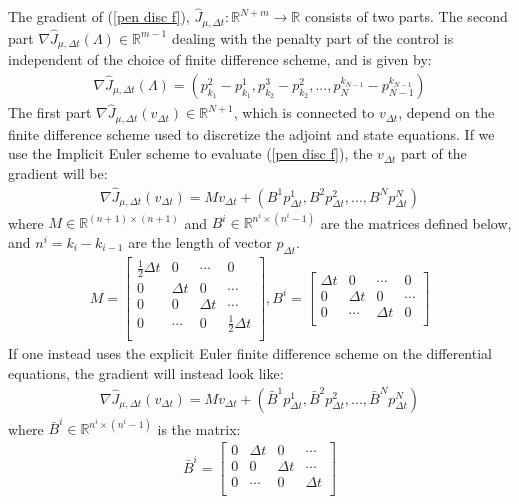 \begin{theorem}
The gradient of (\ref{pen disc f}), $\hat J_{\mu,\Delta t}:\mathbb{R}^{N+m}\rightarrow\mathbb{R}$ consists of two parts. The second part $ \nabla\hat J_{\mu,\Delta t}(\Lambda)\in\mathbb{R}^{m-1}$ dealing with the penalty part of the control is independent of the choice of finite difference scheme, and is given by:
\begin{align}
\nabla\hat J_{\mu,\Delta t}(\Lambda) = (p_{k_1}^{2}-p_{k_1}^{1},p_{k_2}^{3}-p_{k_2}^{2},...,p_{N}^{k_{N-1}}-p_{N-1}^{k_{N-1}}) \label{num_pen_grad_lam}
\end{align} 
The first part $ \nabla\hat J_{\mu,\Delta t}(v_{\Delta t})\in\mathbb{R}^{N+1}$, which is connected to $v_{\Delta t}$, depend on the finite difference scheme used to discretize the adjoint and state equations. If we use the Implicit Euler scheme to evaluate (\ref{pen disc f}), the $v_{\Delta t}$ part of the gradient will be:
\begin{align}
\nabla\hat J_{\mu,\Delta t}(v_{\Delta t})= Mv_{\Delta t} + (B^1p_{\Delta t}^1,B^2p_{\Delta t}^2,...,B^Np_{\Delta t}^N) \label{num_pen_grad_v}
\end{align}
where $M\in \mathbb{R}^{(n+1)\times (n+1)}$ and $B^i\in \mathbb{R}^{n^i\times (n^i-1)}$ are the matrices defined below, and $n^i=k_i-k_{i-1}$ are the length of vector $p_{\Delta t}$.
\begin{align*}
M=\left[ \begin{array}{cccc}
   \frac{1}{2}\Delta t & 0 & \cdots & 0 \\  
   0& \Delta t & 0 & \cdots \\ 
   0 &0 & \Delta t  & \cdots \\
   0 &\cdots &0 & \frac{1}{2}\Delta t   \\
   \end{array}  \right] 
,B^i = \left[ \begin{array}{cccc}  
   \Delta t& 0 & \cdots & 0 \\ 
   0 & \Delta t& 0  & \cdots \\
   0 &\cdots & \Delta t& 0   \\
   \end{array}  \right] 
\end{align*}
If one instead uses the explicit Euler finite difference scheme on the differential equations, the gradient will instead look like:
\begin{align}
\nabla\hat J_{\mu,\Delta t}(v_{\Delta t})= Mv_{\Delta t} + (\bar B^1p_{\Delta t}^1,\bar B^2p_{\Delta t}^2,...,\bar B^Np_{\Delta t}^N)
\end{align}
where $\bar B^i\in \mathbb{R}^{n^i\times (n^i-1)}$ is the matrix:
\begin{align*}
\bar B^i = \left[ \begin{array}{cccc}  
   0 &\Delta t& 0 & \cdots  \\ 
   0 &0 & \Delta t  & \cdots \\
   0 &\cdots &  0& \Delta t   \\
   \end{array}  \right] 
\end{align*}
\end{theorem}
